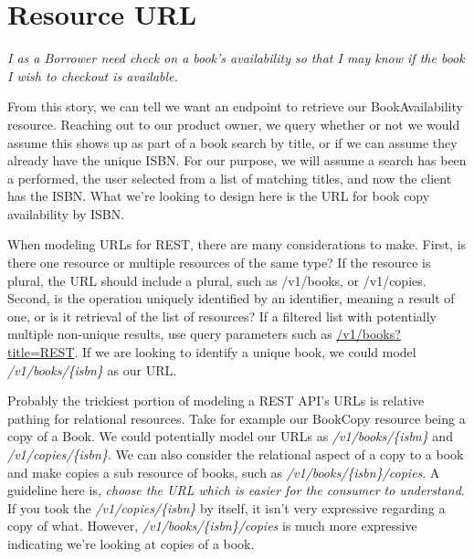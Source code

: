 \section{Resource URL}

\textit{I as a Borrower need check on a book's availability so that I may know if the book I wish to checkout is available.}

From this story, we can tell we want an endpoint to retrieve our BookAvailability resource.  Reaching out to our product owner, we query whether or not we would assume this shows up as part of a book search by title, or if we can assume they already have the unique ISBN.  For our purpose, we will assume a search has been a performed, the user selected from a list of matching titles, and now the client has the ISBN.  What we're looking to design here is the URL for book copy availability by ISBN.

When modeling URLs for REST, there are many considerations to make.  First, is there one resource or multiple resources of the same type?  If the resource is plural, the URL should include a plural, such as /v1/books, or /v1/copies.  Second, is the operation uniquely identified by an identifier, meaning a result of one, or is it retrieval of the list of resources?  If a filtered list with potentially multiple non-unique results, use query parameters such as \url{/v1/books?title=REST}.  If we are looking to identify a unique book, we could model \textit{/v1/books/\{isbn\}} as our URL.

Probably the trickiest portion of modeling a REST API's URLs is relative pathing for relational resources.  Take for example our BookCopy resource being a copy of a Book.  We could potentially model our URLs as \textit{/v1/books/\{isbn\}} and \textit{/v1/copies/\{isbn\}}.  We can also consider the relational aspect of a copy to a book and make copies a sub resource of books, such as \textit{/v1/books/\{isbn\}/copies}.  A guideline here is, \textit{choose the URL which is easier for the consumer to understand}.  If you took the \textit{/v1/copies/\{isbn\}} by itself, it isn't very expressive regarding a copy of what.  However, \textit{/v1/books/\{isbn\}/copies} is much more expressive indicating we're looking at copies of a book.

